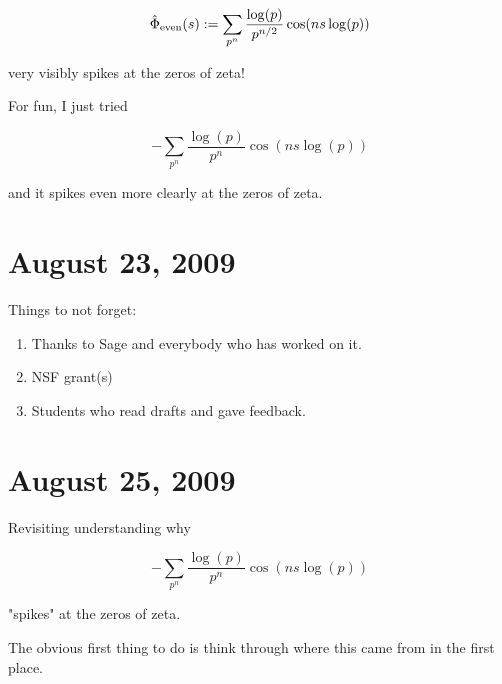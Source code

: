 \documentclass{article}
\begin{document}
$${\hat \Phi}_{\rm even}(s): = \sum_{p^n} {\frac{\log(p)}{p^{n/2}}}\cos(ns \log(p))$$ 

very visibly spikes at the zeros of zeta!

For fun, I just tried 

$$-\sum_{p^n} {\frac{\log(p)}{p^n}}\cos(ns \log(p))$$ 

and it spikes even more clearly at the zeros of zeta. 

\section{August 23, 2009}

Things to not forget:
\begin{enumerate}
\item Thanks to Sage and everybody who has worked on it.
\item NSF grant(s)
\item Students who read drafts and gave feedback. 
\end{enumerate}

\section{August 25, 2009}

Revisiting understanding why 


$$-\sum_{p^n} {\frac{\log(p)}{p^n}}\cos(ns \log(p))$$ 

"spikes" at the zeros of zeta.

The obvious first thing to do is think through where this came from in the first place.
\end{document}
